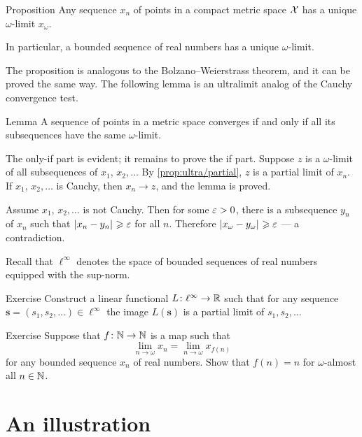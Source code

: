 \begin{thm}{Proposition}\label{prop:ultra/compact}
Any sequence $x_n$ of points in a compact metric space $\mathcal{X}$ has a unique $\omega$-limit $x_\omega$.

In particular, a bounded sequence of real numbers has a unique $\omega$-limit.
\end{thm}

The proposition is  analogous to the Bolzano--Weierstrass theorem,
and it can be proved the same way.
The following lemma is an ultralimit analog of the Cauchy convergence test.

\begin{thm}{Lemma}\label{lem:X-X^w}
A sequence of points in a metric space converges if and only if all its subsequences 
have the same $\omega$-limit.
\end{thm}

The only-if part is evident; it remains to prove the if part.
Suppose $z$ is a $\omega$-limit of all subsequences of $x_1$, $x_2,\dots$
By \ref{prop:ultra/partial}, $z$ is a partial limit of $x_n$.
If $x_1$, $x_2,\dots$ is Cauchy, then $x_n\to z$, and the lemma is proved.

Assume $x_1$, $x_2,\dots$ is not Cauchy.
Then for some $\varepsilon>0$, there is a subsequence $y_n$ of $x_n$ such that $\dist{x_n}{y_n}{}\ge\eps$ for all $n$.
Therefore $\dist{x_\omega}{y_\omega}{}\ge \eps$ --- a contradiction. 
\qeds

Recall that $\ell^\infty$ denotes the space of bounded sequences of real numbers equipped with the sup-norm.

\begin{thm}{Exercise}\label{ex:linear}
Construct a linear functional $L\colon\ell^\infty\to\mathbb{R}$ such that
for any sequence $\bm{s}=(s_1,s_2,\dots)\in \ell^\infty$ the image $L(\bm{s})$ is a partial limit of $s_1,s_2,\dots$
\end{thm}

\begin{thm}{Exercise}\label{ex:ultrakatetov+}
Suppose that $f\colon\mathbb{N}\to\mathbb{N}$ is a map such that 
\[\lim_{n\to\omega}x_n=\lim_{n\to\omega}x_{f(n)}\]
for any bounded sequence $x_n$ of real numbers.
Show that $f(n)=n$ for $\omega$-almost all $n\in\mathbb{N}$.
\end{thm}

\section{An illustration}

